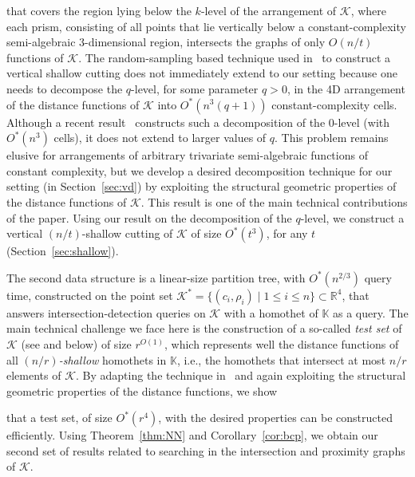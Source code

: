 \documentclass[11pt]{article}
\newif\iffullver
\def\reals{{\mathbb R}}
\def\Kspace{{\mathbb K}}
\def\K{\mathcal{K}}
\theoremstyle{definition}
\begin{document}
that covers the region lying below the $k$-level of 
the arrangement of $\K$, where
each prism, consisting of all points that lie 
vertically below a constant-complexity semi-algebraic 
$3$-dimensional region, intersects the graphs of only $O(n/t)$ functions of $\K$.
The random-sampling based technique used in~\cite{Chan:le,KMRSS} to construct a vertical shallow cutting 
does not immediately extend to our setting because one 
needs to decompose the $q$-level, for some parameter $q>0$, in the 
4D arrangement of the distance functions of $\K$ 
into $O^*(n^3(q+1))$ constant-complexity cells. Although a recent 
result~\cite{AES:vd} constructs such a decomposition of the $0$-level (with $O^*(n^3)$ cells), it does not 
extend to larger values of $q$.
This problem remains elusive for arrangements of arbitrary trivariate semi-algebraic functions of constant complexity, 
but we develop a desired decomposition technique for our setting
(in Section~\ref{sec:vd}) by exploiting the 
structural geometric properties of the distance functions of $\K$. This result is one 
of the main technical contributions of the paper. Using our result on the decomposition of the $q$-level,
we construct a vertical $(n/t)$-shallow 
cutting of $\K$ of size $O^*(t^3)$, for any $t$ (Section~\ref{sec:shallow}). 
\iffullver
We build a tree data structure using vertical shallow cuttings
and adapt the technique in~\cite{AM95} to handle efficient deletions of 
homothets from $\K$; as noted, insertions are handled using the standard Bentley-Saxe technique~\cite{BS80}.
\fi
%
The second data structure is a linear-size partition tree, with $O^*(n^{2/3})$ query time,
constructed on the point set $\K^* = \{ (c_i, \rho_i) \mid 1 \le i \le n\} \subset\reals^4$,
that answers intersection-detection queries on $\K$ with a homothet of 
$\Kspace$ as a query. The main 
technical challenge we face here is the construction of a so-called \emph{test set} of $\K$ 
(see \cite{ShSh} and below) of size $r^{O(1)}$, which represents well the distance functions of all 
\emph{$(n/r)$-shallow} homothets in $\Kspace$, i.e., the homothets that intersect 
at most $n/r$ elements of $\K$. By adapting the technique in~\cite{ShSh} and again exploiting 
the structural geometric properties of the distance functions, we show 
\iffullver
(in Section~\ref{subsec:linear}) 
\fi
that a test set, of size $O^*(r^4)$, with the desired properties can be constructed efficiently.
%
\iffullver
Using Theorem~\ref{thm:NN} and Corollary~\ref{cor:bcp}, we obtain our second set of results 
related to searching in the intersection and proximity graphs of $\K$.
\end{document}
